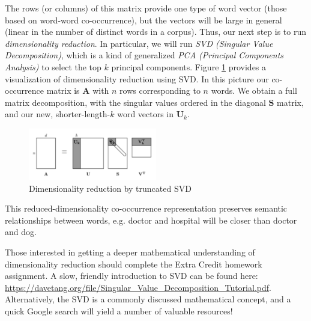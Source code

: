 The rows (or columns) of this matrix provide one type of word vector (those based on word-word co-occurrence), but the vectors will be large in general (linear in the number of distinct words in a corpus). Thus, our next step is to run \textit{dimensionality reduction}. In particular, we will run \textit{SVD (Singular Value Decomposition)}, which is a kind of generalized \textit{PCA (Principal Components Analysis)} to select the top  $k$ principal components. Figure \ref{fig:svd} provides a visualization of dimensionality reduction using SVD. In this picture our co-occurrence matrix is $\textbf{A}$ with $n$ rows corresponding to $n$ words. We obtain a full matrix decomposition, with the singular values ordered in the diagonal $\textbf{S}$ matrix, and our new, shorter-length-$k$ word vectors in $\textbf{U}_k$. 

\begin{figure}[h]
    \centering
    \includegraphics[width=0.5\textwidth]{svd.png}
    \caption{Dimensionality reduction by truncated SVD}
    \label{fig:svd}
\end{figure}

This reduced-dimensionality co-occurrence representation preserves semantic relationships between words, e.g. doctor and hospital will be closer than doctor and dog. \newline

Those interested in getting a deeper mathematical understanding of dimensionality reduction should complete the Extra Credit homework assignment. A slow, friendly introduction to SVD can be found here: \url{https://davetang.org/file/Singular_Value_Decomposition_Tutorial.pdf}. Alternatively, the SVD is a commonly discussed mathematical concept, and a quick Google search will yield a number of valuable resources! 